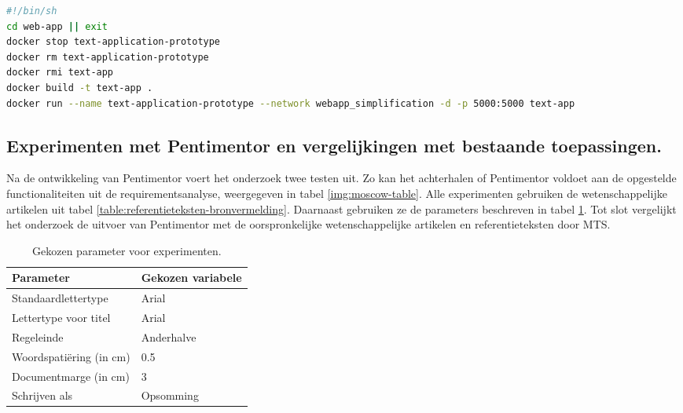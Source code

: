 \begin{lstlisting}[language=Bash, caption={Script voor het opstarten van de Docker-container voor Unix-gebruikers}, label={code:bash-boot}]
#!/bin/sh	
cd web-app || exit
docker stop text-application-prototype
docker rm text-application-prototype
docker rmi text-app
docker build -t text-app .
docker run --name text-application-prototype --network webapp_simplification -d -p 5000:5000 text-app
\end{lstlisting}


\subsection{Experimenten met Pentimentor en vergelijkingen met bestaande toepassingen.}

Na de ontwikkeling van Pentimentor voert het onderzoek twee testen uit. Zo kan het achterhalen of Pentimentor voldoet aan de opgestelde functionaliteiten uit de requirementsanalyse, weergegeven in tabel \ref{img:moscow-table}. Alle experimenten gebruiken de wetenschappelijke artikelen uit tabel \ref{table:referentieteksten-bronvermelding}. Daarnaast gebruiken ze de parameters beschreven in tabel \ref{table:chosen-parameters-experiment}. Tot slot vergelijkt het onderzoek de uitvoer van Pentimentor met de oorspronkelijke wetenschappelijke artikelen en referentieteksten door MTS. 

\begin{table}
	\begin{tabular}{| m{5cm} | m{5cm} |}
	\hline
	\textbf{Parameter} & \textbf{Gekozen variabele} \\ \hline
	Standaardlettertype & Arial \\ \hline
	Lettertype voor titel & Arial \\ \hline
	Regeleinde & Anderhalve \\ \hline
	Woordspatiëring (in cm) & 0.5  \\ \hline
	Documentmarge (in cm) & 3 \\ \hline
	Schrijven als & Opsomming \\ \hline
	\end{tabular}
	\caption{Gekozen parameter voor experimenten.}
	\label{table:chosen-parameters-experiment}
\end{table}